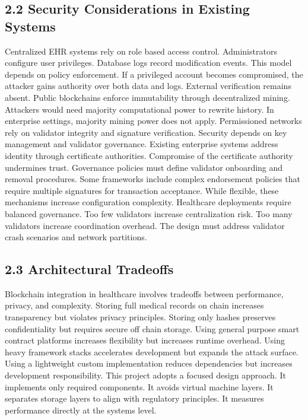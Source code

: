 \subsection*{2.2 Security Considerations in Existing Systems}
Centralized EHR systems rely on role based access control. Administrators configure user privileges. Database logs record modification events. This model depends on policy enforcement. If a privileged account becomes compromised, the attacker gains authority over both data and logs. External verification remains absent.
Public blockchains enforce immutability through decentralized mining. Attackers would need majority computational power to rewrite history. In enterprise settings, majority mining power does not apply. Permissioned networks rely on validator integrity and signature verification. Security depends on key management and validator governance.
Existing enterprise systems address identity through certificate authorities. Compromise of the certificate authority undermines trust. Governance policies must define validator onboarding and removal procedures. Some frameworks include complex endorsement policies that require multiple signatures for transaction acceptance. While flexible, these mechanisms increase configuration complexity.
Healthcare deployments require balanced governance. Too few validators increase centralization risk. Too many validators increase coordination overhead. The design must address validator crash scenarios and network partitions.

\subsection*{2.3 Architectural Tradeoffs}
Blockchain integration in healthcare involves tradeoffs between performance, privacy, and complexity.
Storing full medical records on chain increases transparency but violates privacy principles. Storing only hashes preserves confidentiality but requires secure off chain storage.
Using general purpose smart contract platforms increases flexibility but increases runtime overhead.
Using heavy framework stacks accelerates development but expands the attack surface.
Using a lightweight custom implementation reduces dependencies but increases development responsibility.
This project adopts a focused design approach. It implements only required components. It avoids virtual machine layers. It separates storage layers to align with regulatory principles. It measures performance directly at the systems level.

